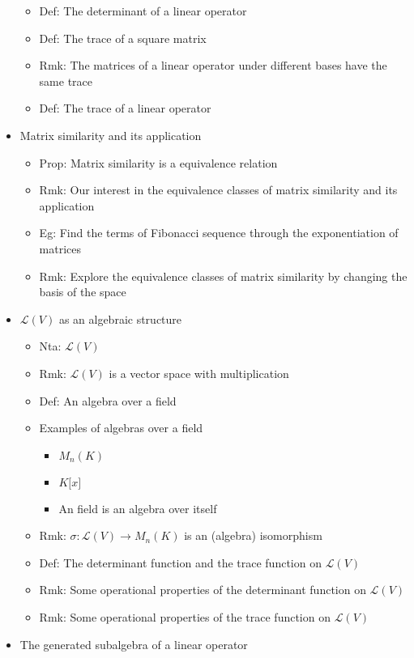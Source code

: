 \documentclass[onecolumn]{ctexart}
\begin{document}
\begin{itemize}
\begin{itemize}
    \item Def: The determinant of a linear operator
    \item Def: The trace of a square matrix
    \item Rmk: The matrices of a linear operator under different bases have the same trace
    \item Def: The trace of a linear operator
  \end{itemize}
  \item Matrix similarity and its application
  \begin{itemize}
    \item Prop: Matrix similarity is a equivalence relation
    \item Rmk: Our interest in the equivalence classes of matrix similarity and its application
    \item Eg: Find the terms of Fibonacci sequence through the exponentiation of matrices
    \item Rmk: Explore the equivalence classes of matrix similarity by changing the basis of the space
  \end{itemize}
  \item $\mathcal{L}(V)$ as an algebraic structure
  \begin{itemize}
    \item Nta: $\mathcal{L}(V)$
    \item Rmk: $\mathcal{L}(V)$ is a vector space with multiplication
    \item Def: An algebra over a field
    \item Examples of algebras over a field
    \begin{itemize}
      \item $M_n(K)$
      \item $K\lbrack x \rbrack$
      \item An field is an algebra over itself
    \end{itemize}
    \item Rmk: $\sigma: \mathcal{L}(V) \to M_n(K)$ is an (algebra) isomorphism
    \item Def: The determinant function and the trace function on $\mathcal{L}(V)$
    \item Rmk: Some operational properties of the determinant function on $\mathcal{L}(V)$
    \item Rmk: Some operational properties of the trace function on $\mathcal{L}(V)$
  \end{itemize}
  \item The generated subalgebra of a linear operator

\end{itemize}
\end{document}

